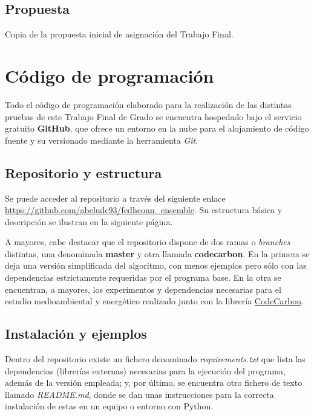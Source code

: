 \documentclass[00-Trabajo_Final.tex]{subfiles}
\begin{document}
\vspace{1em}

\subsection*{Propuesta}
Copia de la propuesta inicial de asignación del Trabajo Final.



\newpage

\section{Código de programación} \label{codigo_seccion}
Todo el código de programación elaborado para la realización de las distintas pruebas de este Trabajo Final de Grado se encuentra hospedado bajo el servicio gratuito \textbf{GitHub}, que ofrece un entorno en la nube para el alojamiento de código fuente y su versionado mediante la herramienta \textit{Git}. 

\subsection*{Repositorio y estructura}
Se puede acceder al repositorio a través del siguiente enlace \url{https://github.com/abeludc93/fedheonn_ensemble}. Su estructura básica y descripción se ilustran en la siguiente página. 

A mayores, cabe destacar que el repositorio dispone de dos ramas o \textit{branches} distintas, una denominada \textbf{master} y otra llamada \textbf{codecarbon}. En la primera se deja una versión simplificada del algoritmo, con menos ejemplos pero sólo con las dependencias estrictamente requeridas por el programa base. En la otra se encuentran, a mayores, los experimentos y dependencias necesarias para el estudio medioambiental y energético realizado junto con la librería \href{https://github.com/mlco2/codecarbon}{CodeCarbon}.

\vspace{1em}

\subsection*{Instalación y ejemplos}
Dentro del repositorio existe un fichero denominado \textit{requirements.txt} que lista las dependencias (librerías externas) necesarias para la ejecución del programa, además de la versión empleada; y, por último, se encuentra otro fichero de texto llamado \textit{README.md}, donde se dan unas instrucciones para la correcta instalación de estas en un equipo o entorno con Python.
\end{document}

